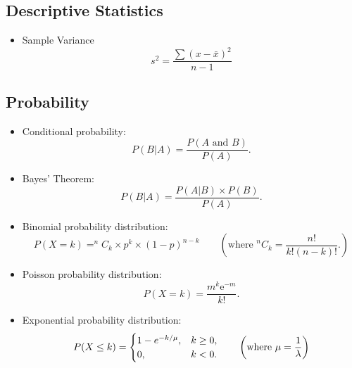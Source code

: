 \documentclass[a4paper,12pt]{article}
\begin{document}
\subsection*{Descriptive Statistics}
\begin{itemize}
\item Sample Variance
\begin{equation*}
s^2 = \frac{\sum (x-\bar{x})^2}{n-1}
\end{equation*}
\end{itemize}
\subsection*{Probability}
\begin{itemize}

\item Conditional probability:
\begin{equation*}
P(B|A)=\frac{P\left( A\text{ and }B\right) }{P\left( A\right) }.
\end{equation*}


\item Bayes' Theorem:
\begin{equation*}
P(B|A)=\frac{P\left(A|B\right) \times P(B) }{P\left( A\right) }.
\end{equation*}





\item Binomial probability distribution:
\begin{equation*}
P(X = k) = ^{n}C_{k} \times p^{k} \times \left( 1-p\right) ^{n-k}\qquad \left( \text{where  }
^{n}C_{k} =\frac{n!}{k!\left(n-k\right) !}. \right)
\end{equation*}

\item Poisson probability distribution:
\begin{equation*}
P(X = k) =\frac{m^{k}\mathrm{e}^{-m}}{k!}.
\end{equation*}

\item Exponential probability distribution:
\begin{equation*}
P(X \leq k) = \begin{cases}
1-e^{- k/\mu}, & k \ge 0, \\
0, & k < 0.
\end{cases}\qquad \left( \text{where  }
\mu = {1\over \lambda}\right)
\end{equation*}
\end{itemize}
\end{document}
